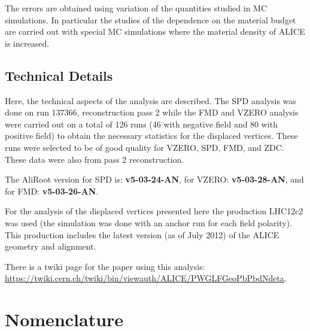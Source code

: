 \documentclass[11pt]{article}
\begin{document}
The errors are obtained using variation of the quantities studied in
MC simulations. In particular the studies of the dependence on the
material budget are carried out with special MC simulations where the
material density of ALICE is increased.

\subsection{Technical Details}

Here, the technical aspects of the analysis are described. The SPD
analysis was done on run 137366, reconstruction pass 2 while the FMD
and VZERO analysis were carried out on a total of 126 runs (46 with
negative field and 80 with positive field) to obtain the necessary
statistics for the displaced vertices. These runs were selected to be
of good quality for VZERO, SPD, FMD, and ZDC. These data were also
from pass 2 reconstruction.

The AliRoot version for SPD is: \textbf{v5-03-24-AN}, for VZERO:
\textbf{v5-03-28-AN}, and for FMD: \textbf{v5-03-26-AN}.

For the analysis of the displaced vertices presented here the
production LHC12c2 was used (the simulation was done with an anchor
run for each field polarity). This production includes the latest
version (as of July 2012) of the ALICE geometry and alignment.

There is a twiki page for the paper using this analysis:
\url{https://twiki.cern.ch/twiki/bin/viewauth/ALICE/PWGLFGeoPbPbdNdeta}.
\clearpage
\appendix 
\section{Nomenclature} 
\label{app:nomen}
\end{document}
